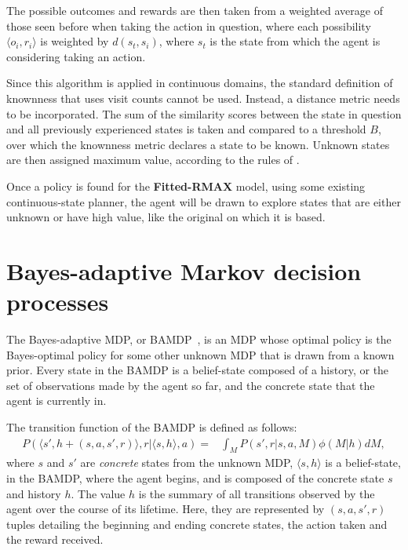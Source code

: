 The possible outcomes and rewards are then taken from a weighted average of those seen before when taking the action in question, where each possibility $\langle o_i, r_i \rangle$ is weighted by $d(s_t, s_i)$, where $s_t$ is the state from which the agent is considering taking an action.

Since this algorithm is applied in continuous domains, the standard definition of knownness that uses visit counts cannot be used.  Instead, a distance metric needs to be incorporated. The sum of the similarity scores between the state in question and all previously experienced states is taken and compared to a threshold $B$, over which the knownness metric declares a state to be known. Unknown states are then assigned maximum value, according to the rules of .

Once a policy is found for the {\bf Fitted-RMAX} model, using some existing continuous-state planner, the agent will be drawn to explore states that are either unknown or have high value, like the original  on which it is based.



\section{Bayes-adaptive Markov decision processes}

The Bayes-adaptive MDP, or BAMDP~\cite{duff03}, is an MDP whose optimal policy is the Bayes-optimal policy for some other unknown MDP that is drawn from a known prior. Every state in the BAMDP is a belief-state composed of a history, or the set of observations made by the agent so far, and the concrete state that the agent is currently in.

The transition function of the BAMDP is defined as follows:
\begin{eqnarray}
\label{rel:bamdp:prob}
P(\langle s', h + (s,a,s',r)\rangle, r | \langle s, h\rangle, a) =& \int_M P(s', r | s, a, M)\phi(M|h) dM,
\end{eqnarray}
where $s$ and $s'$ are \emph{concrete} states from the unknown MDP, $\langle s, h\rangle$ is a belief-state, in the BAMDP, where the agent begins, and is composed of the concrete state $s$ and history $h$. The value $h$ is the summary of all transitions observed by the agent over the course of its lifetime. Here, they are represented by $(s, a, s',r)$ tuples detailing the beginning and ending concrete states, the action taken and the reward received.

